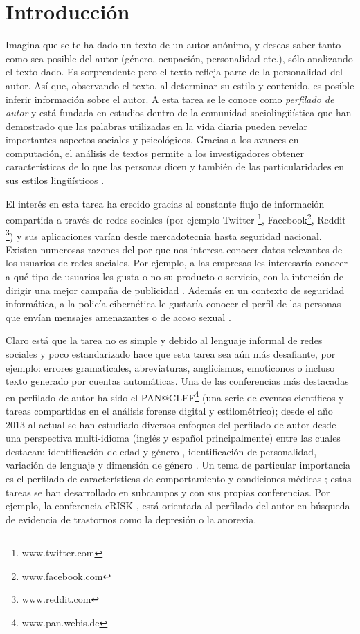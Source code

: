 \chapter{Introducción}

Imagina que se te ha dado un texto de un autor anónimo, y deseas saber tanto como sea posible del autor (género, ocupación, personalidad etc.), sólo analizando el texto dado. Es sorprendente pero el texto refleja parte de la personalidad del autor. Así que, observando el texto, al  determinar su estilo y contenido, es posible inferir información sobre el autor. A esta tarea se le conoce como \textit{perfilado de autor} y está fundada en estudios dentro de la comunidad sociolingüística que han demostrado que las palabras utilizadas en la vida diaria pueden revelar importantes aspectos sociales y psicológicos. Gracias a los avances en computación, el análisis de textos permite a los investigadores obtener características de lo que las personas dicen y también de las particularidades en sus estilos lingüísticos \citep{Pennebaker2002}. 

El interés en esta tarea ha crecido gracias al constante flujo de información compartida a través de redes sociales (por ejemplo Twitter \footnote{www.twitter.com}, Facebook\footnote{www.facebook.com}, Reddit \footnote{www.reddit.com}) y sus aplicaciones varían desde mercadotecnia hasta seguridad nacional. 
Existen numerosas razones del por que nos interesa conocer datos relevantes de los usuarios de redes sociales. Por ejemplo, a las empresas les interesaría conocer a qué tipo de usuarios les gusta o no su producto o servicio, con la intención de dirigir una mejor campaña de publicidad \citep{ikeda2013twitter}. Además en un contexto de seguridad informática, a la policía cibernética le gustaría conocer el perfil de las personas que envían mensajes amenazantes o de acoso sexual \citep{bogdanova2012impact}.

Claro está que la tarea no es simple y debido al lenguaje informal de redes sociales y poco estandarizado hace que esta tarea sea aún más desafiante, por ejemplo: errores gramaticales, abreviaturas, anglicismos, emoticonos o incluso texto generado por cuentas automáticas. Una de las conferencias más destacadas en perfilado de autor ha sido el PAN@CLEF\footnote{www.pan.webis.de} (una serie de eventos científicos y tareas compartidas en el análisis forense digital y estilométrico); desde el año 2013 al actual se han estudiado diversos enfoques del perfilado de autor desde una perspectiva multi-idioma (inglés y español principalmente) entre las cuales destacan: identificación de edad y género \citep{Rangel2013b}, identificación de personalidad, variación de lenguaje y dimensión de género \citep{Stammatatos2015}. Un tema de particular importancia es el perfilado de características de comportamiento \citep{kumar2018aggression} y condiciones médicas \citep{de2013predicting}; estas tareas se han desarrollado en subcampos y con sus propias conferencias. Por ejemplo, la conferencia eRISK \citep{Losada2018}, está orientada al perfilado del autor en búsqueda de evidencia de trastornos como la depresión o la anorexia. 



